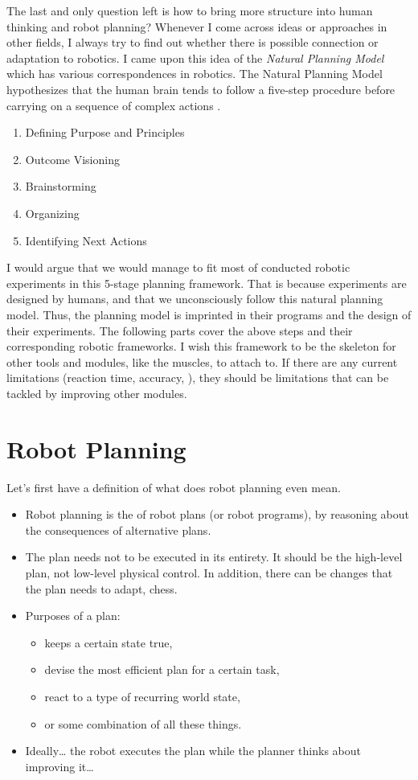 The last and only question left is how to bring more structure into human thinking and robot planning? Whenever I come across ideas or approaches in other fields, I always try to find out whether there is possible connection or adaptation to robotics. I came upon this idea of the \textit{Natural Planning Model} which has various correspondences in robotics. The Natural Planning Model hypothesizes that the human brain tends to follow a five-step procedure before carrying on a sequence of complex actions \cite{allen2002getting}. 
\begin{enumerate}
	\item Defining Purpose and Principles
	\item Outcome Visioning
	\item Brainstorming
	\item Organizing
	\item Identifying Next Actions
\end{enumerate}

I would argue that we would manage to fit most of conducted robotic experiments in this 5-stage planning framework. That is because experiments are designed by humans, and that we unconsciously follow this natural planning model. Thus, the planning model is imprinted in their programs and the design of their experiments. The following parts cover the above steps and their corresponding robotic frameworks. I wish this framework to be the skeleton for other tools and modules, like the muscles, to attach to. If there are any current limitations (reaction time, accuracy, \etc), they should be limitations that can be tackled by improving other modules.

\section{Robot Planning}
Let's first have a definition of what does robot planning even mean. \cite{mcdermott1992robot, siciliano2008springer}
\begin{itemize}
	\item Robot planning is the  of robot plans (or robot programs), by reasoning  about the consequences of alternative plans.
	\item The plan needs not to be executed in its entirety. It should be the high-level plan, not low-level physical control. In addition, there can be changes that the plan needs to adapt, \eg chess.
	\item Purposes of a plan:
	\begin{itemize}
		\item keeps a certain state true,
		\item devise the most efficient plan for a certain task,
		\item react to a type of recurring world state,
		\item or some combination of all these things.
	\end{itemize}
	\item Ideally… the robot executes the plan while the planner thinks about improving it…	
\end{itemize}

